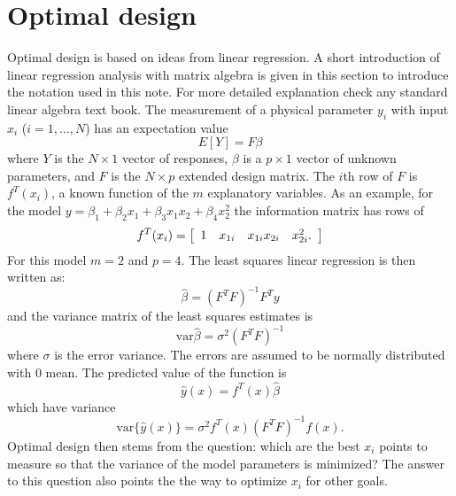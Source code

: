\documentclass[12pt]{iopart}
\begin{document}
\section{Optimal design}
\label{sec:optdesign}
Optimal design is based on ideas from linear regression. A short introduction of linear regression analysis with matrix algebra is given in this section to introduce the notation used in this note. For more detailed explanation check any standard linear algebra text book. The measurement of a physical parameter $y_i$ with input $x_i$ ($i=1, \ldots, N$) has an expectation value
\begin{equation}
E[Y] = F \beta
\end{equation}
where $Y$ is the $N \times 1$ vector of responses, $\beta$ is a $p \times 1$ vector of unknown parameters, and $F$ is the $N \times p$ extended design matrix. The $i$th row of $F$ is $f^T(x_i)$, a known function of the $m$ explanatory variables. As an example, for the model $y = \beta_1 + \beta_2 x_1 + \beta_3 x_1 x_2 + \beta_4 x_2^2$ the information matrix has rows of
\begin{equation}
f^T(x_i) = \left[
	\begin{array}{c c c c}
	1 & x_{1i} & x_{1i}x_{2i} & x_{2i}^2.
	\end{array}\right]
\end{equation}
For this model $m = 2$ and $p = 4$. The least squares linear regression is then written as:
\begin{equation}
\hat \beta = (F^T F)^{-1} F^T y
\end{equation}
and the variance matrix of the least squares estimates is
\begin{equation}
\mathrm{var} \hat \beta = \sigma^2 (F^T F)^{-1}
\label{eq:varbeta}
\end{equation}
where $\sigma$ is the error variance. The errors are assumed to be normally distributed with 0 mean. The predicted value of the function is
\begin{equation}
\hat y(x) = f^T(x) \hat \beta
\end{equation}
which have variance
\begin{equation}
\mathrm{var}\{\hat y(x)\} = \sigma^2 f^T(x)\left(F^T F\right)^{-1}f(x).
\end{equation}
Optimal design then stems from the question: which are the best $x_i$ points to measure so that the variance of the model parameters is minimized? The answer to this question also points the the way to optimize $x_i$ for other goals.
\end{document}
